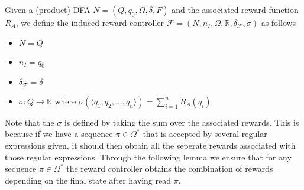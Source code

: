 \begin{definition}
Given a (product) DFA $N=(Q,q_0,\Omega,\delta,F)$ and the associated reward function $R_A$, we define the induced reward controller $\mathcal{F}=(N,n_I,\Omega, \mathbb{R}, \delta_\mathcal{F},\sigma)$ as follows
\begin{itemize}
\item $N=Q$
\item $n_I=q_0$
\item $\delta_\mathcal{F}=\delta$
\item $\sigma: Q\to\mathbb{R}$ where $\sigma(\langle q_1,q_2,\dots, q_n\rangle) = \sum\limits _{i=1}^n R_A(q_i)$
\end{itemize}
\label{d:reward_controller_regex}
\end{definition}

Note that the $\sigma$ is defined by taking the sum over the associated rewards. This is because if we have a sequence $\pi\in\Omega^*$ that is accepted by several regular expressions given, it should then obtain all the seperate rewards associated with those regular expressions. Through the following lemma we ensure that for any sequence $\pi\in\Omega^*$ the reward controller obtains the combination of rewards depending on the final state after having read $\pi$.

